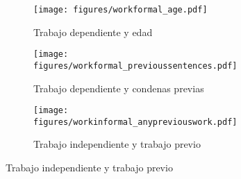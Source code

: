 \begin{figure}[htp]
\caption{Trabajo Efectos Marginales} 
\label{work:marginal_effects}
\centering
  \begin{subfigure}[b]{0.5\linewidth}
    \centering
    \caption{Trabajo dependiente y edad}
    \texttt{[image: figures/workformal\_age.pdf]}
  \end{subfigure}%
  \begin{subfigure}[b]{0.5\linewidth}
    \centering   
    \caption{Trabajo dependiente y condenas previas}
    \texttt{[image: figures/workformal\_previoussentences.pdf]}
  \end{subfigure}
    \begin{subfigure}[b]{0.5\linewidth}
    \centering
    \caption{Trabajo independiente y trabajo previo}
    \texttt{[image: figures/workinformal\_anypreviouswork.pdf]}
  \end{subfigure}
\end{figure}